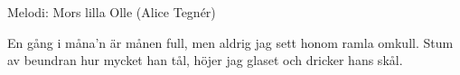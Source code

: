 \begin{song}

\begin{songmeta}
Melodi: Mors lilla Olle (Alice Tegnér)
\end{songmeta}

\begin{songtext}
En gång i måna'n är månen full,
men aldrig jag sett honom ramla omkull.
Stum av beundran hur mycket han tål,
höjer jag glaset och dricker hans skål.
\end{songtext}

\end{song}
